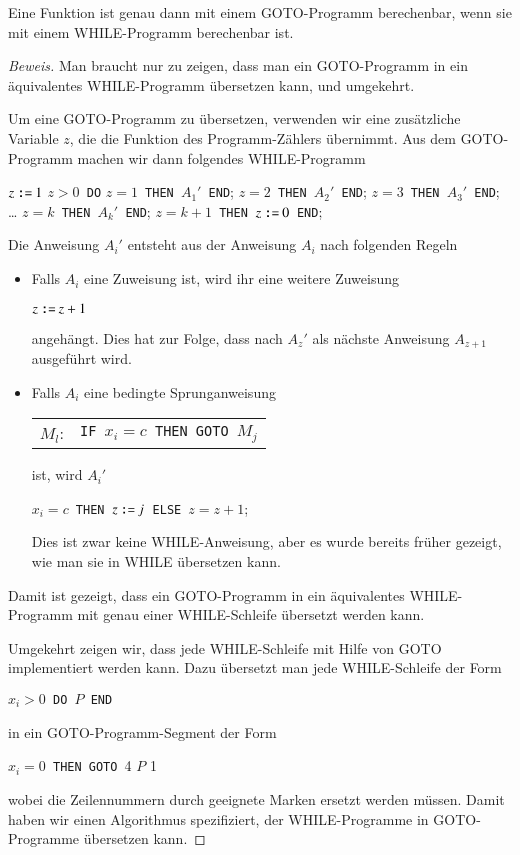 \begin{satz}
Eine Funktion ist genau dann mit einem GOTO-Programm berechenbar,
wenn sie mit einem WHILE-Programm berechenbar ist.
\end{satz}
\begin{proof}[Beweis]
Man braucht nur zu zeigen, dass man ein GOTO-Programm in ein äquivalentes
WHILE-Programm übersetzen kann, und umgekehrt.

Um eine GOTO-Programm zu übersetzen, verwenden wir eine zusätzliche Variable
$z$, die die Funktion des Programm-Zählers übernimmt.
Aus dem GOTO-Programm machen wir dann folgendes WHILE-Programm
\begin{algorithmic}
\STATE $z \mathbin{\texttt{:=}} 1$
$z>0${\tt\ DO}
$z=1${\tt\ THEN\ }$A_1'${\tt\ END};
$z=2${\tt\ THEN\ }$A_2'${\tt\ END};
$z=3${\tt\ THEN\ }$A_3'${\tt\ END};
\STATE\dots
{}$z=k${\tt\ THEN\ }$A_k'${\tt\ END};
$z=k+1${\tt\ THEN\ }$z \mathbin{\texttt{:=}} 0${\tt\ END};
\end{algorithmic}
Die Anweisung $A_i'$ entsteht aus der Anweisung $A_i$ nach folgenden
Regeln
\begin{itemize}
\item Falls $A_i$ eine Zuweisung ist, wird ihr eine weitere Zuweisung
\begin{algorithmic}
\STATE $z \mathbin{\texttt{:=}} z+1$
\end{algorithmic}
angehängt.
Dies hat zur Folge, dass nach $A_z'$ als nächste Anweisung
$A_{z+1}$ ausgeführt wird.
\item
Falls $A_i$ eine bedingte Sprunganweisung
\begin{center}
\begin{tabular}{rl}
$M_l$:&{\tt IF\ }$x_i=c${\tt\ THEN GOTO\ }$M_j$
\end{tabular}
\end{center}
ist, wird $A_i'$
\begin{algorithmic}
$x_i=c${\tt\ THEN\ }$z \mathbin{\texttt{:=}} j${\tt\ ELSE }$z=z+1$;
\end{algorithmic}
Dies ist zwar keine WHILE-Anweisung, aber es wurde bereits
früher gezeigt, wie man sie in WHILE übersetzen kann.
\end{itemize}
Damit ist gezeigt, dass ein GOTO-Programm in ein äquivalentes WHILE-Programm
mit genau einer WHILE-Schleife übersetzt werden kann.

Umgekehrt zeigen wir, dass jede WHILE-Schleife mit Hilfe von GOTO
implementiert werden kann. Dazu übersetzt man jede WHILE-Schleife
der Form
\begin{algorithmic}
$x_i>0${\tt\ DO }$P${\tt\ END}
\end{algorithmic}
in ein GOTO-Programm-Segment der Form
\begin{algorithmic}[1]
$x_i=0${\tt\ THEN GOTO }4
\STATE$P$
1
\STATE
\end{algorithmic}
wobei die Zeilennummern durch geeignete Marken ersetzt werden müssen.
Damit haben wir einen Algorithmus spezifiziert, der WHILE-Programme in
GOTO-Programme übersetzen kann.
\end{proof}

